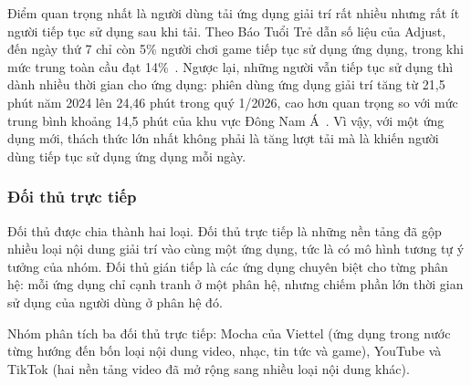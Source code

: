 Điểm quan trọng nhất là người dùng tải ứng dụng giải trí rất nhiều nhưng rất ít người tiếp tục sử dụng sau khi tải.
Theo Báo Tuổi Trẻ dẫn số liệu của Adjust, đến ngày thứ 7 chỉ còn 5\% người chơi game tiếp tục sử dụng ứng dụng, trong khi mức trung toàn cầu đạt 14\%~\cite{tuoitre-gamedownloads2026}.
Ngược lại, những người vẫn tiếp tục sử dụng thì dành nhiều thời gian cho ứng dụng: phiên dùng ứng dụng giải trí tăng từ 21,5 phút năm 2024 lên 24,46 phút trong quý 1/2026, cao hơn quan trọng so với mức trung bình khoảng 14,5 phút của khu vực Đông Nam Á~\cite{tuoitre-gamedownloads2026}.
Vì vậy, với một ứng dụng mới, thách thức lớn nhất không phải là tăng lượt tải mà là khiến người dùng tiếp tục sử dụng ứng dụng mỗi ngày.

\subsubsection{Đối thủ trực tiếp}

Đối thủ được chia thành hai loại.
Đối thủ trực tiếp là những nền tảng đã gộp nhiều loại nội dung giải trí vào cùng một ứng dụng, tức là có mô hình tương tự ý tưởng của nhóm.
Đối thủ gián tiếp là các ứng dụng chuyên biệt cho từng phân hệ: mỗi ứng dụng chỉ cạnh tranh ở một phân hệ, nhưng chiếm phần lớn thời gian sử dụng của người dùng ở phân hệ đó.

Nhóm phân tích ba đối thủ trực tiếp: Mocha của Viettel (ứng dụng trong nước từng hướng đến bốn loại nội dung video, nhạc, tin tức và game), YouTube và TikTok (hai nền tảng video đã mở rộng sang nhiều loại nội dung khác).

